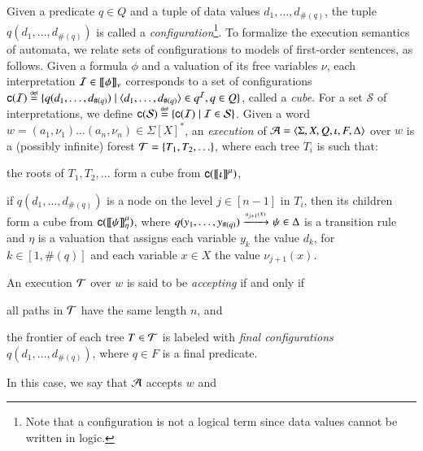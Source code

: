 \documentclass{llncs}
\begin{document}
Given a predicate $q \in Q$ and a tuple of data values
$d_1,\ldots,d_{\#(q)}$, the tuple $q(d_1,\ldots,d_{\#(q)})$ is called
a \emph{configuration}\footnote{Note that a configuration is not a
  logical term since data values cannot be written in logic.}. To
formalize the execution semantics of automata, we relate sets of
configurations to models of first-order sentences, as follows. Given a
formula $\phi$ and a valuation of its free variables $\nu$, each
interpretation $\mathcal{I} \in {\bf [\![} \phi {\bf ]\!]}_\nu$ corresponds to a set of
configurations $\mathsf{c}({\mathcal{I}}) \stackrel{\scriptscriptstyle{\mathsf{def}}}{=} \{ q(d_1,\ldots,d_{\#(q)}) \mid
  \langle d_1,\ldots,d_{\#(q)} \rangle \in q^{\mathcal{I}}, q \in Q \}$, called a
\emph{cube}. For a set $\mathcal{S}$ of interpretations, we define
$\mathsf{c}({\mathcal{S}}) \stackrel{\scriptscriptstyle{\mathsf{def}}}{=} \{ \mathsf{c}({\mathcal{I}}) \mid \mathcal{I} \in
  \mathcal{S} \}$. Given a word $w=(a_1,\nu_1) \ldots (a_n,\nu_n) \in
\Sigma[X]^*$, an \emph{execution} of
$\mathcal{A}=\langle \Sigma,X,Q,\iota,F,\Delta \rangle$ over $w$ is a (possibly
infinite) forest $\mathcal{T} = \{ T_1,T_2,\ldots \}$, where each tree $T_i$ is
such that:
\begin{compactitem}
\item the roots of $T_1, T_2, \ldots$ form a cube from
  $\mathsf{c}({{\bf [\![} \iota {\bf ]\!]}^\mu})$, %
%
%
\item if $q(d_1,\ldots,d_{\#(q)})$ is a node on the level $j \in
  [n-1]$ in $T_i$, then its children form a cube from
  $\mathsf{c}({{\bf [\![} \psi {\bf ]\!]}^\mu_\eta})$, where \(q(y_1,\ldots,y_{\#(q)})
  \xrightarrow{{\scriptscriptstyle a_{j+1}(X)}}_{{\scriptstyle }} \psi \in \Delta\) is a transition rule and
  $\eta$ is a valuation that assigns each variable $y_k$ the value
  $d_k$, for $k \in [1,\#(q)]$ and each variable $x \in X$ the value
  $\nu_{j+1}(x)$. %
\end{compactitem}
An execution $\mathcal{T}$ over $w$ is said to be \emph{accepting} if and only
if \begin{inparaenum}[(i)]
\item all paths in $\mathcal{T}$ have the same length $n$, and
\item the frontier of each tree $T \in \mathcal{T}$ is labeled with \emph{final
  configurations} $q(d_1,\ldots,d_{\#(q)})$, where $q \in F$ is a
  final predicate.
\end{inparaenum} In this case, we say that $\mathcal{A}$ accepts $w$ and
\end{document}
